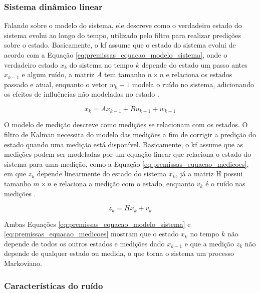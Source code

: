\documentclass[acronym, symbols, table, deposito]{fei}
\begin{document}
			\subsubsection{Sistema dinâmico linear}
			
				Falando sobre o modelo do sistema, ele descreve como o verdadeiro estado do sistema evolui ao longo do tempo, utilizado pelo filtro para realizar predições sobre o estado. Basicamente, o \acrshort{kf} assume que o estado do sistema evolui de acordo com a Equação \eqref{eq:premissas_equacao_modelo_sistema}, onde o verdadeiro estado $x_k$ do sistema no tempo $k$ depende do estado um passo antes $x_{k-1}$ e algum ruído, a matriz $A$ tem tamanho $n \times n$ e relaciona os estados passado e atual, enquanto o vetor $w_k-1$ modela o ruído no sistema, adicionando os efeitos de influências não modeladas no estado \cite{urrea2021kalman}.
				
				\begin{equation}\label{eq:premissas_equacao_modelo_sistema}
					x_k = Ax_{k-1} + Bu_{k-1} + w_{k-1}
				\end{equation}
			
				O modelo de medição descreve como medições se relacionam com os estados. O filtro de Kalman necessita do modelo das medições a fim de corrigir a predição do estado quando uma medição está disponível. Basicamente, o \acrshort{kf} assume que as medições podem ser modeladas por um equação linear que relaciona o estado do sistema para uma medição, como a Equação \eqref{eq:premissas_equacao_medicoes}, em que $z_k$ depende linearmente do estado do sistema $x_k$, já a matriz H possui tamanho $m \times n$ e relaciona a medição com o estado, enquanto $v_k$ é o ruído nas medições \cite{khodarahmi2023review}.
				
				\begin{equation}\label{eq:premissas_equacao_medicoes}
					z_k = Hx_k + v_k
				\end{equation}
			
				Ambas Equações \eqref{eq:premissas_equacao_modelo_sistema} e \eqref{eq:premissas_equacao_medicoes} mostram que o estado $x_k$ no tempo $k$ não depende de todos os outros estados e medições dado $x_{k-1}$ e que a medição $z_k$ não depende de qualquer estado ou medida, o que torna o sistema um processo Markoviano.
			
			\subsubsection{Características do ruído}
				
\end{document}
